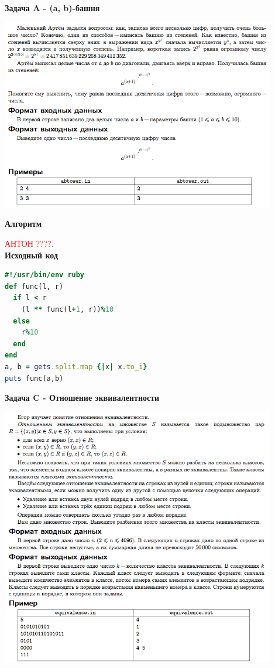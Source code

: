 \documentclass[a4paper,12pt]{article}
\begin{document}
\newpage
\textbf{{\large Задача A - (a, b)-башня}}

\begin{center}
\includegraphics[width=0.9\textwidth]{OC_Peterhof/A.png}\\ [1cm]
\end{center}

\textbf{{\large Алгоритм}}

\textcolor{red}{\Huge{АНТОН ????}}. \\

\textbf{{\large Исходный код}} \\
\begin{lstlisting}[language=Ruby]
#!/usr/bin/env ruby
def func(l, r)
  if l < r
    (l ** func(l+1, r))%10
  else
    r%10
  end
end
a, b = gets.split.map {|x| x.to_i}
puts func(a,b)

\end{lstlisting}


\newpage
\textbf{{\large Задача C - Отношение эквивалентности}}

\begin{center}
\includegraphics[width=0.9\textwidth]{OC_Peterhof/C.png}\\ [1cm]
\end{center}
\end{document}

